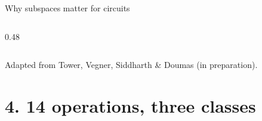 \documentclass[aspectratio=169,11pt]{beamer}
\begin{document}
\begin{frame}{Why subspaces matter for circuits}
\begin{columns}[T]
\begin{column}{0.48\textwidth}
\vspace{0.3em}
\end{column}
\end{columns}

\vspace{0.3em}
{\footnotesize Adapted from Tower, Vegner, Siddharth \& Doumas (in preparation).}
\end{frame}



\begin{frame}[plain]
\vfill
\begin{center}
  \setlength{\fboxrule}{2.5pt}%
\end{center}
\vfill
\end{frame}

\section{4. 14 operations, three classes}
\end{document}
